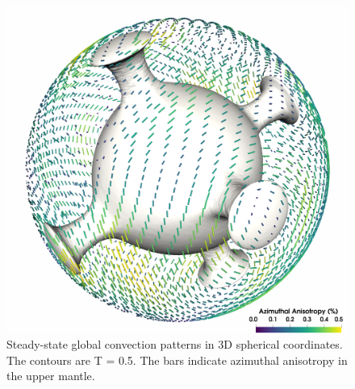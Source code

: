 \begin{figure}[ht]
    \centering
    \includegraphics[width=1.0\textwidth]{cookbooks/3Dspherical_cubic2white.png}
    \caption{Steady-state global convection patterns in 3D spherical coordinates. The contours are T = 0.5. The bars indicate azimuthal anisotropy in the upper mantle.\\
    }
    \label{fig:globalconvection}
\end{figure}

\vfill %